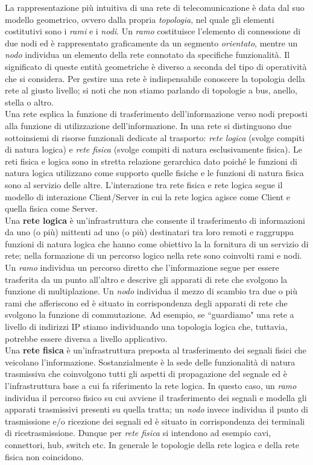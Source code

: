 La rappresentazione più intuitiva di una rete di telecomunicazione è data dal suo modello geometrico, ovvero dalla propria \textit{topologia}, nel quale gli elementi costitutivi sono i \textit{rami} e i \textit{nodi}. Un \textit{ramo} costituisce l'elemento di connessione di due nodi ed è rappresentato graficamente da un segmento \textit{orientato}, mentre un \textit{nodo} individua un elemento della rete connotato da specifiche funzionalità. Il significato di queste entità geometriche è diverso a seconda del tipo di operatività che si considera. Per gestire una rete è indispensabile conoscere la topologia della rete al giusto livello; si noti che non stiamo parlando di topologie a bus, anello, stella o altro.\\
Una rete esplica la funzione di trasferimento dell'informazione verso nodi preposti alla funzione di utilizzazione dell'informazione. In una rete si distinguono due sottoinsiemi di risorse funzionali dedicate al trasporto: \textit{rete logica} (svolge compiti di natura logica) e \textit{rete fisica} (svolge compiti di natura esclusivamente fisica). Le reti fisica e logica sono in stretta relazione gerarchica dato poiché le funzioni di natura logica utilizzano come supporto quelle fisiche e le funzioni di natura fisica sono al servizio delle altre. L'interazione tra rete fisica e rete logica segue il modello di interazione Client/Server in cui la rete logica agisce come Client e quella fisica come Server.\\
Una \textbf{rete logica} è un'infrastruttura che consente il trasferimento di informazioni da uno (o più) mittenti ad uno (o più) destinatari tra loro remoti e raggruppa funzioni di natura logica che hanno come obiettivo la la fornitura di un servizio di rete; nella formazione di un percorso logico nella rete sono coinvolti rami e nodi. Un \textit{ramo} individua un percorso diretto che l'informazione segue per essere trasferita da un punto all'altro e descrive gli apparati di rete che svolgono la funzione di multiplazione. Un \textit{nodo} individua il mezzo di scambio tra due o più rami che afferiscono ed è situato in corrispondenza degli apparati di rete che svolgono la funzione di commutazione. Ad esempio, se \textquotedblleft guardiamo" una rete a livello di indirizzi IP stiamo individuando una topologia logica che, tuttavia, potrebbe essere diversa a livello applicativo.\\
Una \textbf{rete fisica} è un'infrastruttura preposta al trasferimento dei segnali fisici che veicolano l'informazione. Sostanzialmente è la sede delle funzionalità di natura trasmissiva che coinvolgono tutti gli aspetti di propagazione del segnale ed è l'infrastruttura base a cui fa riferimento la rete logica. In questo caso, un \textit{ramo} individua il percorso fisico su cui avviene il trasferimento dei segnali e modella gli apparati trasmissivi presenti su quella tratta; un \textit{nodo} invece individua il punto di trasmissione e/o ricezione dei segnali ed è situato in corrispondenza dei terminali di ricetrasmissione. Dunque per \textit{rete fisica} si intendono ad esempio cavi, connettori, hub, switch etc. In generale le topologie della rete logica e della rete fisica non coincidono.


